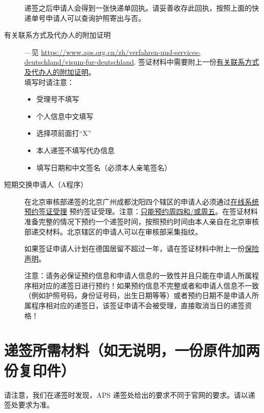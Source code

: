 \begin{description}
递签之后申请人会得到一张快递单回执。请妥善收存此回执，按照上面的快递单号申请人可以查询护照寄出与否。
\item[有关联系方式及代办人的附加证明\label{inline-additional-proof}] ---见 \url{https://www.aps.org.cn/zh/verfahren-und-services-deutschland/visum-fur-deutschland}.
签证材料中需要附上一份\href{https://china.diplo.de/blob/1341728/895a5533a3c35c4fd2fbc21e92d6dfa3/pdf-formular-zusatzerklaerung-erreichbarkeit-data.pdf}{有关联系方式及代办人的附加证明}。\\
填写时请注意：
\begin{itemize}
  \item 受理号不填写
  \item 个人信息中文填写
  \item 选择项前面打“X”
  \item 本人递签不填写代办信息
  \item 填写日期和中文签名（必须本人亲笔签名）
\end{itemize}
\item[短期交换申请人（A程序）]
在北京审核部递签的北京广州成都沈阳四个辖区的申请人必须通过\href{https://service2.diplo.de/rktermin/extern/choose_category.do?locationCode=peki&realmId=12&categoryId=156&request_locale=de}{在线系统预约签证受理} 预约签证受理。注意：\underline{只能预约周四和/或周五}。在签证材料准备完整的情况下预约一个递签时间，按照预约时间由本人亲自在北京审核部递交材料。北京辖区的申请人可以在审核部采集指纹。

如果签证申请人计划在德国居留不超过一年，请在签证材料中附上一份\href{https://www.aps.org.cn/wp-content/uploads/Belehrung_KV.pdf}{保险声明}。

注意：请务必保证预约信息和申请人信息的一致性并且只能在申请人所属程序相对应的递签日进行预约！如果预约信息不完整或者和申请人信息不一致（例如护照号码，身份证号码，出生日期等等）或者预约日期不是申请人所属程序相对应的递签日，该签证申请不会被受理，直接取消当日的递签资格！
\end{description}


\section{递签所需材料（如无说明，一份原件加两份复印件）}\label{sec:visa-material}
请注意，我们在递签时发现，APS 递签处给出的要求不同于官网的要求。请以递签处要求为准。

